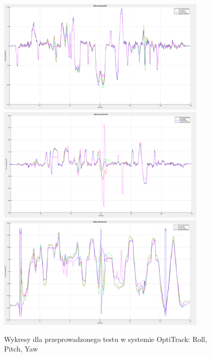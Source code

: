 \begin{figure}[h!]
    \centering
    \includegraphics[width=0.9\textwidth]{Rysunki/Rozdzial07/OptiTrack_Roll_wykres.png}
    \includegraphics[width=0.9\textwidth]{Rysunki/Rozdzial07/OptiTrack_Pitch_wykres.png}
    \includegraphics[width=0.9\textwidth]{Rysunki/Rozdzial07/OptiTrack_Yaw_wykres.png}
    \caption{Wykresy dla przeprowadzonego testu w systemie OptiTrack: Roll, Pitch, Yaw}
    \label{Wykresy OptiTrack RPY}
\end{figure}


